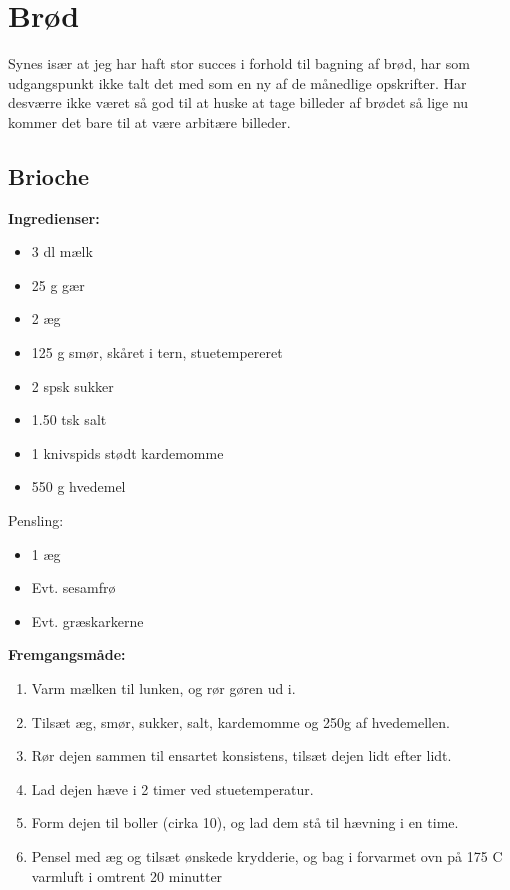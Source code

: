 \documentclass{book}
\begin{document}
\chapter{Brød}
\minitoc
Synes især at jeg har haft stor succes i forhold til bagning af brød, har som udgangspunkt ikke talt det med som en ny af de månedlige opskrifter. Har desværre ikke været så god til at huske at tage billeder af brødet så lige nu kommer det bare til at være arbitære billeder.
\newpage \section{Brioche}
\begin{minipage}[t]{0.5\textwidth}
\textbf{Ingredienser:}
\begin{itemize}
    \item 3 dl mælk
    \item 25 g gær
    \item 2 æg
    \item 125 g smør, skåret i tern, stuetempereret
    \item 2 spsk sukker
    \item 1.50 tsk salt
    \item 1 knivspids stødt kardemomme
    \item 550 g hvedemel
\end{itemize}
Pensling:
\begin{itemize}
    \item 1 æg
    \item Evt. sesamfrø
    \item Evt. græskarkerne
\end{itemize}
\end{minipage}
\begin{minipage}[t]{0.5\textwidth}
\textbf{Fremgangsmåde:}
\begin{enumerate}
    \item Varm mælken til lunken, og rør gøren ud i.
    \item Tilsæt æg, smør, sukker, salt, kardemomme og 250g af hvedemellen.
    \item Rør dejen sammen til ensartet konsistens, tilsæt dejen lidt efter lidt.
    \item Lad dejen hæve i 2 timer ved stuetemperatur.
    \item Form dejen til boller (cirka 10), og lad dem stå til hævning i en time.
    \item Pensel med æg og tilsæt ønskede krydderie, og bag i forvarmet ovn på 175 \degree C varmluft i omtrent 20 minutter
\end{enumerate}
\end{minipage}
\end{document}
